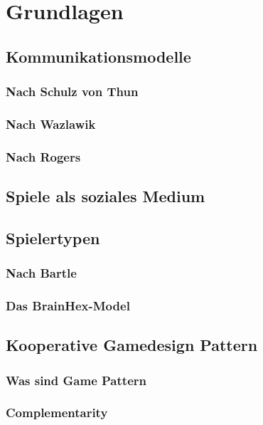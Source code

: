 \chapter{Grundlagen}

\section{Kommunikationsmodelle}
\subsection{Nach Schulz von Thun}
\subsection{Nach Wazlawik}
\subsection{Nach Rogers}

\section{Spiele als soziales Medium}
\cite{depping_trust_2016}
\cite{gerling_designing_2014}
\cite{ducheneaut_alone_2006}

\section{Spielertypen}

\subsection{Nach Bartle}
\cite{bartle_hearts_nodate}
\subsection{Das BrainHex-Model}
\cite{nacke_brainhex_2014}

\section{Kooperative Gamedesign Pattern}
\subsection{Was sind Game Pattern}
\cite{bjork_patterns_2005}

\subsection{Complementarity}


